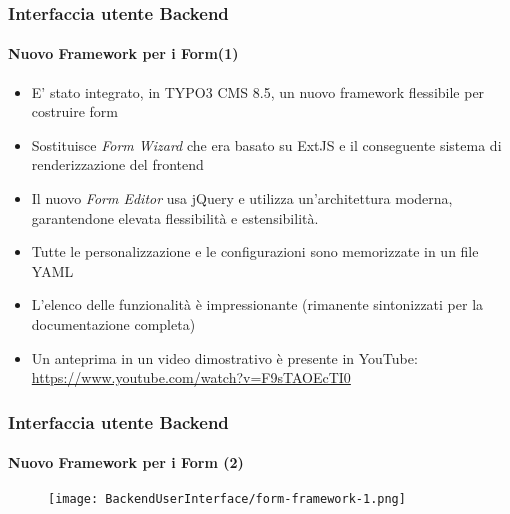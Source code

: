 \begin{frame}[fragile]
	\frametitle{Interfaccia utente Backend}
	\framesubtitle{Nuovo Framework per i Form(1)}

	\begin{itemize}
		\item E' stato integrato, in TYPO3 CMS 8.5, un nuovo framework flessibile per costruire form 
		\item Sostituisce \textit{Form Wizard} che era basato su ExtJS e il conseguente sistema di renderizzazione del frontend
		\item Il nuovo \textit{Form Editor} usa jQuery e utilizza un'architettura moderna,
			garantendone elevata flessibilità e estensibilità.
		\item Tutte le personalizzazione e le configurazioni sono memorizzate in un file YAML
		\item L'elenco delle funzionalità è impressionante\newline
			\small(rimanente sintonizzati per la documentazione completa)\normalsize
		\item Un anteprima in un video dimostrativo è presente in YouTube:\newline
			\url{https://www.youtube.com/watch?v=F9sTAOEcTI0}
	\end{itemize}

\end{frame}
\begin{frame}[fragile]
	\frametitle{Interfaccia utente Backend}
	\framesubtitle{Nuovo Framework per i Form (2)}

	\begin{figure}
		\texttt{[image: BackendUserInterface/form-framework-1.png]}
	\end{figure}

\end{frame}

